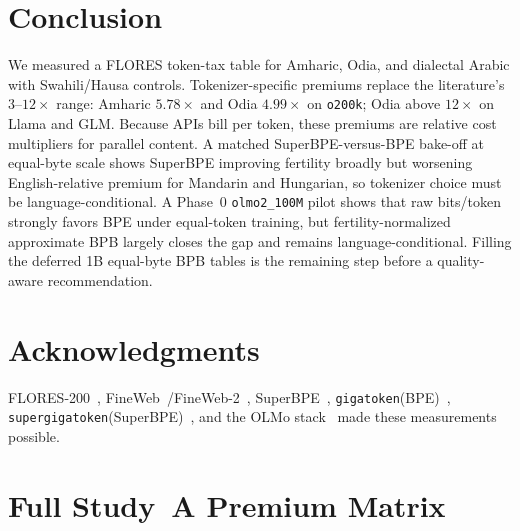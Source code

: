 \documentclass[11pt,a4paper]{article}
\begin{document}
\section{Conclusion}
\label{sec:conclusion}

We measured a FLORES token-tax table for Amharic, Odia, and dialectal Arabic with Swahili/Hausa controls.
Tokenizer-specific premiums replace the literature's $3$--$12\times$ range: Amharic $5.78\times$ and Odia $4.99\times$ on \texttt{o200k}; Odia above $12\times$ on Llama and GLM.
Because APIs bill per token, these premiums are relative cost multipliers for parallel content.
A matched SuperBPE-versus-BPE bake-off at equal-byte scale shows SuperBPE improving fertility broadly but worsening English-relative premium for Mandarin and Hungarian, so tokenizer choice must be language-conditional.
A Phase~0 \texttt{olmo2\_100M} pilot shows that raw bits/token strongly favors BPE under equal-token training, but fertility-normalized approximate BPB largely closes the gap and remains language-conditional.
Filling the deferred 1B equal-byte BPB tables is the remaining step before a quality-aware recommendation.

\section*{Acknowledgments}
FLORES-200~\citep{goyal2022flores,nllb2022}, FineWeb~/FineWeb-2~\citep{penedo2024fineweb,penedo2025fineweb2}, SuperBPE~\citep{liu2025superbpe}, \texttt{gigatoken}(BPE)~\citep{roed2026gigatoken}, \texttt{supergigatoken}(SuperBPE)~\citep{verma2026supergigatoken}, and the OLMo stack~\citep{olmo2025} made these measurements possible.




\appendix
\section{Full Study~A Premium Matrix}
\label{app:full-premium}
\end{document}
